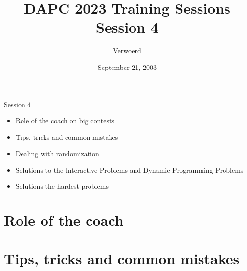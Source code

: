 \documentclass[11pt,pdf, aspectratio=169]{beamer}
\title{DAPC 2023 Training Sessions\\Session 4}
\author{Verwoerd}
\date{September 21, 2003}
\begin{document}
  \maketitle
  \begin{frame}{Session 4}
    \begin{itemize}
      \item Role of the coach on big contests
      \item Tips, tricks and common mistakes
      \item Dealing with randomization
      \item Solutions to the Interactive Problems and Dynamic Programming Problems
      \item Solutions the hardest problems
    \end{itemize}
    \doclicenseThis
  \end{frame}


  \section{Role of the coach}


  \section{Tips, tricks and common mistakes}
\end{document}
